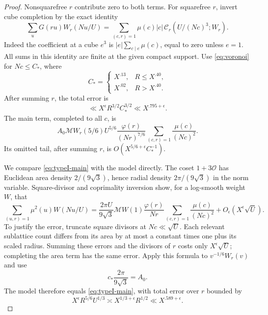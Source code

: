 \begin{proof}
Nonsquarefree $r$ contribute zero to both terms. For squarefree $r$,
invert cube completion by the exact identity
\begin{equation}
 \sum_uG(ru)W_r(Nu/U)
 =\sum_{(c,r)=1}\mu(c)|c|\,
       \mathcal C_r(U/(Nc)^3;W_r).
 \label{eq:inverse-completion}
\end{equation}
Indeed the coefficient at a cube $e^3$ is
$|e|\sum_{c\mid e}\mu(c)$, equal to zero unless $e=1$.
All sums in this identity are finite at the given compact support.
Use \eqref{eq:voronoi} for $Nc\le C_*$, where
\[
 C_*=
 \begin{cases}
 X^{.13},& R\le X^{.40},\\
 X^{.02},& R>X^{.40}.
 \end{cases}
\]
After summing $r$, the total error is
\begin{equation}
 \ll X^\epsilon R^{3/2}C_*^{3/2}\ll X^{.795+\epsilon}.
 \label{eq:short-completion-error}
\end{equation}
The main term, completed to all $c$, is
\begin{equation}
 A_0\mathcal MW_r(5/6)U^{5/6}
 \frac{\varphi(r)}{(Nr)^{7/6}}
 \sum_{(c,r)=1}\frac{\mu(c)}{(Nc)^2}.
 \label{eq:typeI-main}
\end{equation}
Its omitted tail, after summing $r$, is
$O(X^{5/6+\epsilon}C_*^{-1})$.

We compare \eqref{eq:typeI-main} with the model directly.
The coset $1+3\mathcal O$ has Euclidean area density $2/(9\sqrt3)$,
hence radial density $2\pi/(9\sqrt3)$ in the norm variable.
Square-divisor and coprimality inversion show, for a log-smooth
weight $W$, that
\[
 \sum_{(u,r)=1}\mu^2(u)W(Nu/U)
 =\frac{2\pi U}{9\sqrt3}\mathcal MW(1)
       \frac{\varphi(r)}{Nr}
       \sum_{(c,r)=1}\frac{\mu(c)}{(Nc)^2}
       +O_\epsilon(X^\epsilon\sqrt U).
\]
To justify the error, truncate square divisors at $Nc\ll\sqrt U$.
Each relevant sublattice count differs from its area by at most a
constant times one plus its scaled radius. Summing these errors and
the divisors of $r$ costs only $X^\epsilon\sqrt U$; completing the
area term has the same error.
Apply this formula to $v^{-1/6}W_r(v)$ and use
\[
 c_*\frac{2\pi}{9\sqrt3}=A_0.
\]
The model therefore equals \eqref{eq:typeI-main}, with total error
over $r$ bounded by
\begin{equation}
 X^\epsilon R^{5/6}U^{1/3}
 \asymp X^{1/3+\epsilon}R^{1/2}
 \ll X^{.589+\epsilon}.
 \label{eq:typeI-lattice-error}
\end{equation}


\end{proof}
